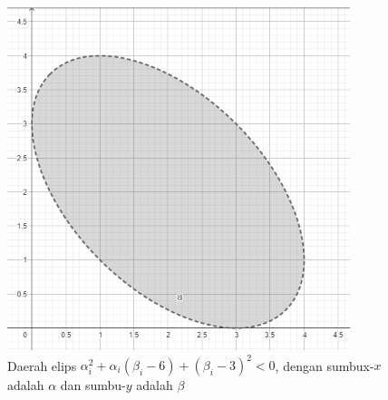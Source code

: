 \begin{figure}[H]
    \centering
    \includegraphics[width=10cm]{Images/daerahMonotonElips.png}
    \caption{Daerah elips $\alpha_i^2 + \alpha_i(\beta_i - 6) + (\beta_i - 3)^2 < 0$, dengan sumbux-$x$ adalah $\alpha$ dan sumbu-$y$ adalah $\beta$}
    \label{fig:my_label}
\end{figure}


